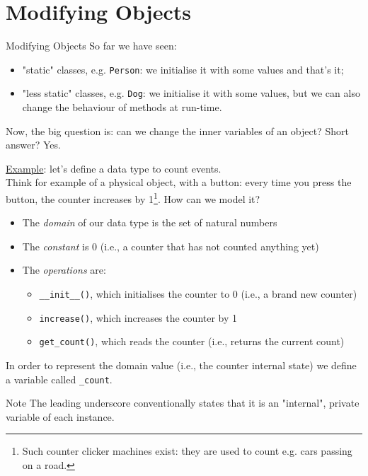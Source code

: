 \documentclass[t,handout,9pt]{beamer}
\begin{document}
\section{Modifying Objects}
\begin{frame}{Modifying Objects}
\vfill
So far we have seen:
\begin{itemize}
	\item "static" classes, e.g. \texttt{Person}: we initialise it with some values and that's it;
	\item  "less static" classes, e.g. \texttt{Dog}: we initialise it with some values, but we can also change the behaviour of methods at run-time.
\end{itemize}
\vfill
Now, the big question is: can we change the inner variables of an object?
\vfill
Short answer? Yes.
\vfill
\end{frame}
%
\begin{frame}
\vfill
\underline{Example}: let's define a data type to count events.\\
Think for example of a physical object, with a button: every time you press the button, the counter increases by 1\footnote{Such counter clicker machines exist: they are used to count e.g. cars passing on a road.}.
\vfill
How can we model it?
\begin{itemize}
	\item The \textit{domain} of our data type is the set of natural numbers
	\item The \textit{constant} is 0 (i.e., a counter that has not counted anything yet)
	\item The \textit{operations} are:
	\begin{itemize}
	\item \texttt{\_\_init\_\_()}, which initialises the counter to 0 (i.e., a brand new counter)
	\item \texttt{increase()}, which increases the counter by 1
	\item \texttt{get\_count()}, which reads the counter (i.e., returns the current count)
	\end{itemize}
\end{itemize}
\vfill
In order to represent the domain value (i.e., the counter internal state) we define a variable called \texttt{\_count}.
\begin{block}{Note}
The leading underscore conventionally states that it is an "internal", private variable of each instance.
\end{block}
\vfill
\end{frame}
\end{document}
